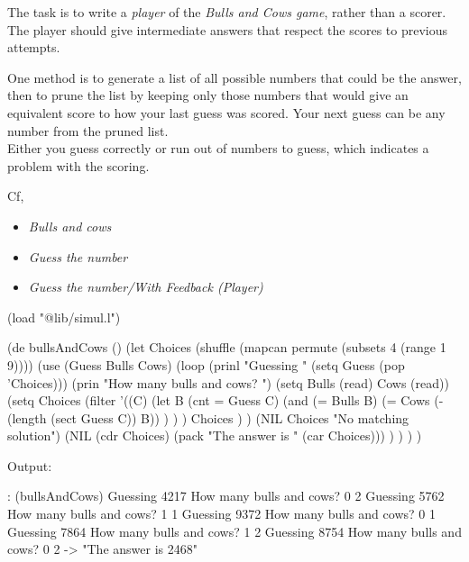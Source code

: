 The task is to write a \emph{player} of the
\emph{Bulls and Cows game}, rather than a
scorer. The player should give intermediate answers that respect the
scores to previous attempts.

One method is to generate a list of all possible numbers that could be
the answer, then to prune the list by keeping only those numbers that
would give an equivalent score to how your last guess was scored. Your
next guess can be any number from the pruned list.\\ Either you guess
correctly or run out of numbers to guess, which indicates a problem with
the scoring.

Cf,

\begin{itemize}
\item
  \emph{Bulls and cows}
\item
  \emph{Guess the number}
\item
  \emph{Guess the number/With Feedback (Player)}
\end{itemize}

\begin{wideverbatim}

(load "@lib/simul.l")

(de bullsAndCows ()
   (let Choices (shuffle (mapcan permute (subsets 4 (range 1 9))))
      (use (Guess Bulls Cows)
         (loop
            (prinl "Guessing " (setq Guess (pop 'Choices)))
            (prin "How many bulls and cows? ")
            (setq Bulls (read)  Cows (read))
            (setq Choices
               (filter
                  '((C)
                     (let B (cnt = Guess C)
                        (and
                           (= Bulls B)
                           (= Cows (- (length (sect Guess C)) B)) ) ) )
                  Choices ) )
            (NIL Choices "No matching solution")
            (NIL (cdr Choices) (pack "The answer is " (car Choices))) ) ) ) )

\end{wideverbatim}

\begin{wideverbatim}

Output:

: (bullsAndCows)
Guessing 4217
How many bulls and cows? 0 2
Guessing 5762
How many bulls and cows? 1 1
Guessing 9372
How many bulls and cows? 0 1
Guessing 7864
How many bulls and cows? 1 2
Guessing 8754
How many bulls and cows? 0 2
-> "The answer is 2468"

\end{wideverbatim}



